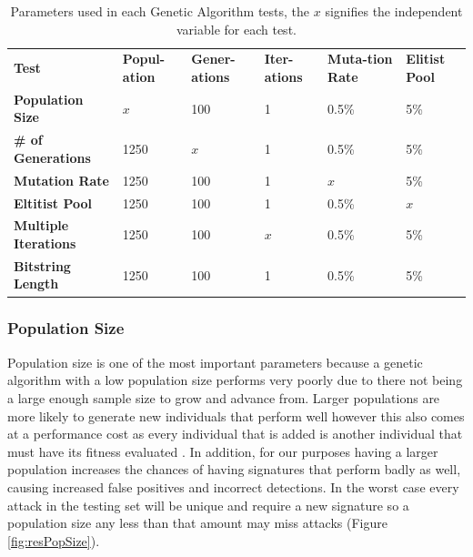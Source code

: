 \begin{table}[h]
	\centering
	\begin{tabular}{|p{1.5in}|p{0.675in}|p{0.675in}|p{0.675in}|p{0.675in}|p{0.675in}|}
	\hline
	\textbf{Test} & \textbf{Popul-ation} & \textbf{Gener-ations} & \textbf{Iter-ations} & \textbf{Muta-tion Rate} & \textbf{Elitist Pool} \\
	\hhline{|=|=|=|=|=|=|}
	\textbf{Population Size} & \textbf{$x$} & 100 & 1 & 0.5\% & 5\% \\
	\hline
	\textbf{\# of Generations} & 1250 & \textbf{$x$} & 1 & 0.5\% & 5\% \\
	\hline
	\textbf{Mutation Rate} & 1250 & 100 & 1 & \textbf{$x$} & 5\% \\
	\hline
	\textbf{Eltitist Pool} & 1250 & 100 & 1 & 0.5\% & \textbf{$x$} \\
	\hline
	\textbf{Multiple Iterations} & 1250 & 100 & \textbf{$x$} & 0.5\% & 5\% \\
	\hline
	\textbf{Bitstring Length} & 1250 & 100 & 1 & 0.5\% & 5\% \\
	\hline
	\end{tabular}
	\caption{Parameters used in each Genetic Algorithm tests, the \textbf{$x$} signifies the independent variable for each test.}
	\label{tab:gaTestParameters}
\end{table}

\newpage
\subsubsection{Population Size} \label{sec:resPopulation}

Population size is one of the most important parameters because a genetic algorithm with a low population size performs very poorly due to there not being a large enough sample size to grow and advance from.  Larger populations are more likely to generate new individuals that perform well however this also comes at a performance cost as every individual that is added is another individual that must have its fitness evaluated \cite{optimizationOfControlParameters}.  In addition, for our purposes having a larger population increases the chances of having signatures that perform badly as well, causing increased false positives and incorrect detections.  In the worst case every attack in the testing set will be unique and require a new signature so a population size any less than that amount may miss attacks (Figure \ref{fig:resPopSize}).

